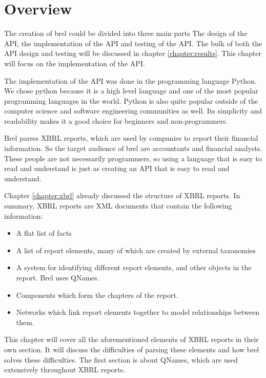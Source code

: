 \section{Overview}

The creation of brel could be divided into three main parts 
The design of the API, the implementation of the API and testing of the API.
The bulk of both the API design and testing will be discussed in chapter \ref{chapter:results}.
This chapter will focus on the implementation of the API.

The implementation of the API was done in the programming language Python.
We chose python because it is a high level language and one of the most popular programming languages in the world.
Python is also quite popular outside of the computer science and software engineering communities as well.
Its simplicity and readability makes it a good choice for beginners and non-programmers.

Brel parses XBRL reports, which are used by companies to report their financial information.
So the target audience of brel are accountants and financial analysts.
These people are not necessarily programmers, 
so using a language that is easy to read and understand is just as creating an API that is easy to read and understand.

Chapter \ref{chapter:xbrl} already discussed the structure of XBRL reports. 
In summary, XBRL reports are XML documents that contain the following information:

\begin{itemize}
    \item A flat list of facts
    \item A list of report elements, many of which are created by external taxonomies
    \item A system for identifying different report elements, and other objects in the report.
    Brel uses QNames.
    \item Components which form the chapters of the report.
    \item Networks which link report elements together to model relationships between them.
\end{itemize}

This chapter will cover all the aforementioned elements of XBRL reports in their own section.
It will discuss the difficulties of parsing these elements and how brel solves these difficulties.
The first section is about QNames, which are used extensively throughout XBRL reports.